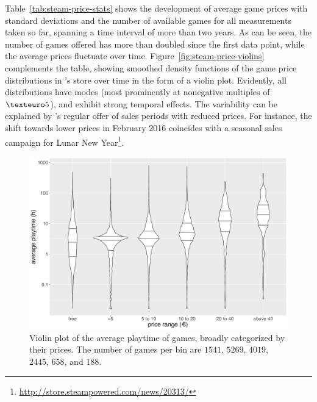 Table~\ref{tab:steam-price-stats} shows the development of average
\steam game prices with standard deviations and the number of available
games for all \steam measurements taken so far, spanning a time interval
of more than two years. As can be seen, the number of games offered
has more than doubled since the first data point, while the average
prices fluctuate over time.
Figure~\ref{fig:steam-price-violins} complements the table, showing
smoothed density functions of the game price distributions in \steam's
store over time in the form of a violin plot.
Evidently, all distributions have modes (most prominently at nonegative
multiples of $\texteuro 5$), and exhibit strong temporal effects.
The variability can be explained by \steam's regular offer of sales
periods with reduced prices. For instance, the shift towards lower
prices in February 2016 coincides with a seasonal sales campaign
for Lunar New Year\footnote{\url{http://store.steampowered.com/news/20313/}}.




\begin{figure}[!t]
	\centering
	\includegraphics[width=1.0\columnwidth]{images/steam-cost-vs-playtime-non-sale.pdf}
	\caption{Violin plot of the average playtime of \steam games, broadly categorized by their prices. The number of games per bin are $1541$, $5269$, $4019$, $2445$, $658$, and $188$.}
\label{fig:steam-cost-vs-playtime-violin}
\end{figure}

